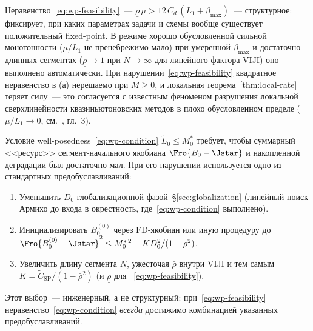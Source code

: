 \begin{remark}
\label{rem:wp-interpretation}
Неравенство~\eqref{eq:wp-feasibility}~--- $\underline\rho\,\mu > 12\, C_d\,(L_1 + \beta_{\max})$~---
структурное: фиксирует, при каких параметрах задачи и схемы вообще
существует положительный fixed-point. В режиме хорошо обусловленной
сильной монотонности ($\mu/L_1$ не пренебрежимо мало) при умеренной
$\beta_{\max}$ и достаточно длинных сегментах
($\underline\rho \to 1$ при $N \to \infty$ для линейного фактора VIJI)
оно выполнено автоматически. При нарушении~\eqref{eq:wp-feasibility}
квадратное неравенство в (а) нерешаемо при $M\ge 0$, и локальная
теорема~\ref{thm:local-rate} теряет силу~--- это согласуется с
известным феноменом разрушения локальной сверхлинейности
квазиньютоновских методов в плохо обусловленном пределе
($\mu/L_1 \to 0$, см.~\cite{dennis1996}, гл.~3).

Условие well-posedness~\eqref{eq:wp-condition} $\tilde L_0 \le M_0^{*}$
требует, чтобы суммарный <<ресурс>> сегмент-начального якобиана
$\Fro{B_0 - \Jstar}$ и накопленной деградации был достаточно мал. При его
нарушении используется одно из стандартных предобуславливаний:
\begin{enumerate}
\item Уменьшить $D_0$ глобализационной фазой~\S\ref{sec:globalization}
(линейный поиск Армихо до входа в окрестность, где~\eqref{eq:wp-condition}
выполнено).
\item Инициализировать $B_0^{(0)}$ через FD-якобиан или иную процедуру
до $\Fro{B_0^{(0)} - \Jstar}^2 \le M_0^{*\,2} - K D_0^2/(1-\rho^2)$.
\item Увеличить длину сегмента $N$, ужесточая $\bar\rho$ внутри VIJI и
тем самым $K = \widetilde C_{\mathrm{SP}}/(1-\bar\rho^2)$ (и $\underline\rho$ для
~\eqref{eq:wp-feasibility}).
\end{enumerate}
Этот выбор~--- инженерный, а не структурный: при~\eqref{eq:wp-feasibility}
неравенство~\eqref{eq:wp-condition} \emph{всегда} достижимо комбинацией
указанных предобуславливаний.
\end{remark}

